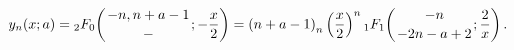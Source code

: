 \[\mathop{y_{n}\/}\nolimits\!\left(x;a\right)=\mathop{{{}_{2}F_{0}}\/}\nolimits%
\!\left({-n,n+a-1\atop-};-\frac{x}{2}\right)=\left(n+a-1\right)_{n}\left(\frac%
{x}{2}\right)^{n}\mathop{{{}_{1}F_{1}}\/}\nolimits\!\left({-n\atop-2n-a+2};%
\frac{2}{x}\right).\]